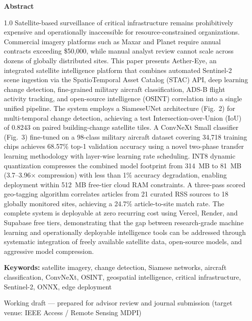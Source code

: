 \documentclass[11pt,a4paper]{article}
\begin{document}
\begin{titlepage}
\begin{center}
\begin{minipage}{0.85\textwidth}
\centering
{\sffamily\bfseries\normalsize Abstract\par}
\vspace{0.4cm}
\begin{spacing}{1.0}
\small
Satellite-based surveillance of critical infrastructure remains prohibitively expensive and operationally inaccessible for resource-constrained organizations. Commercial imagery platforms such as Maxar and Planet require annual contracts exceeding \$50,000, while manual analyst review cannot scale across dozens of globally distributed sites. This paper presents Aether-Eye, an integrated satellite intelligence platform that combines automated Sentinel-2 scene ingestion via the SpatioTemporal Asset Catalog (STAC) API, deep learning change detection, fine-grained military aircraft classification, ADS-B flight activity tracking, and open-source intelligence (OSINT) correlation into a single unified pipeline. The system employs a SiameseUNet architecture (Fig.~2) for multi-temporal change detection, achieving a test Intersection-over-Union (IoU) of 0.8243 on paired building-change satellite tiles. A ConvNeXt Small classifier (Fig.~3) fine-tuned on a 98-class military aircraft dataset covering 34,718 training chips achieves 68.57\% top-1 validation accuracy using a novel two-phase transfer learning methodology with layer-wise learning rate scheduling. INT8 dynamic quantization compresses the combined model footprint from 314~MB to 81~MB (3.7--3.96$\times$ compression) with less than 1\% accuracy degradation, enabling deployment within 512~MB free-tier cloud RAM constraints. A three-pass scored geo-tagging algorithm correlates articles from 21 curated RSS sources to 18 globally monitored sites, achieving a 24.7\% article-to-site match rate. The complete system is deployable at zero recurring cost using Vercel, Render, and Supabase free tiers, demonstrating that the gap between research-grade machine learning and operationally deployable intelligence tools can be addressed through systematic integration of freely available satellite data, open-source models, and aggressive model compression.
\end{spacing}

\vspace{0.5cm}
{\small\textbf{Keywords:} satellite imagery, change detection, Siamese networks, aircraft classification, ConvNeXt, OSINT, geospatial intelligence, critical infrastructure, Sentinel-2, ONNX, edge deployment\par}
\end{minipage}

\vfill
{\footnotesize Working draft --- prepared for advisor review and journal submission (target venue: IEEE Access / Remote Sensing MDPI)\par}
\end{center}
\end{titlepage}
\end{document}
